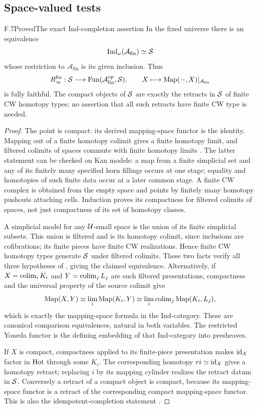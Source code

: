 \subsection{Space-valued tests}

\begin{claim}{F.7}{Proved}{The exact Ind-completion assertion}
In the fixed universe there is an equivalence
\[
 \operatorname{Ind}_{\omega}(\mathcal A_{\mathrm{fin}})\simeq\mathcal S
\]
whose restriction to $\mathcal A_{\mathrm{fin}}$ is its given
inclusion. Thus
\[
 R_{\infty}^{\mathrm{fin}}:\mathcal S\longrightarrow
 \operatorname{Fun}(\mathcal A_{\mathrm{fin}}^{\mathrm{op}},\mathcal S),
 \qquad X\longmapsto\operatorname{Map}(-,X)|_{\mathcal A_{\mathrm{fin}}}
\]
is fully faithful. The compact objects of $\mathcal S$ are exactly the
retracts in $\mathcal S$ of finite CW homotopy types; no assertion that
all such retracts have finite CW type is needed.
\end{claim}
\begin{proof}
The point is compact: its derived mapping-space functor is the
identity. Mapping out of a finite homotopy colimit gives a finite
homotopy limit, and filtered colimits of spaces commute with finite
homotopy limits \citep[Proposition~5.3.3.3]{Lurie2009}. The latter statement can be checked on Kan models:
a map from a finite simplicial set and any of its finitely many
specified horn fillings occurs at one stage; equality and homotopies
of such finite data occur at a later common stage. A finite CW
complex is obtained from the empty space and points by finitely
many homotopy pushouts attaching cells. Induction proves its
compactness for filtered colimits of spaces, not just compactness
of its set of homotopy classes.

A simplicial model for any $\mathcal U$-small space is the union of its
finite simplicial subsets. This union is filtered and is its
homotopy colimit, since inclusions are cofibrations; its finite
pieces have finite CW realizations. Hence finite CW homotopy types
generate $\mathcal S$ under filtered colimits. These two facts verify
all three hypotheses of
\citet[Proposition~5.3.5.11(2)]{Lurie2009}, giving the claimed
equivalence. Alternatively, if
$X=\operatorname{colim}_iK_i$ and $Y=\operatorname{colim}_jL_j$ are such filtered presentations,
compactness and the universal property of the source colimit give
\[
 \operatorname{Map}(X,Y)\simeq
 \lim_i\operatorname{Map}(K_i,Y)\simeq
 \lim_i\operatorname{colim}_j\operatorname{Map}(K_i,L_j),
\]
which is exactly the mapping-space formula in the Ind-category.
These are canonical comparison equivalences, natural in both
variables. The restricted Yoneda functor is the defining embedding
of that Ind-category into presheaves.

If $X$ is compact, compactness applied to its finite-piece
presentation makes $\mathrm{id}_X$ factor in $\mathrm{Hot}$ through some $K_i$.
The corresponding homotopy $r i\simeq\mathrm{id}_X$ gives a homotopy
retract; replacing $i$ by its mapping cylinder realizes the retract
datum in $\mathcal S$. Conversely a retract of a compact object is compact,
because its mapping-space functor is a retract of the corresponding
compact mapping-space functor. This is also the idempotent-completion
statement \citet[Lemma~5.4.2.4]{Lurie2009}.
\end{proof}

